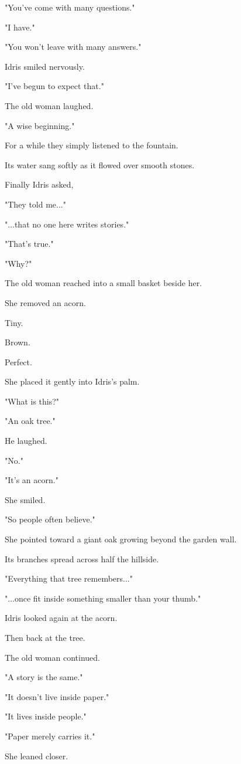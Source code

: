 \documentclass[12pt,openany]{book}
\begin{document}
"You've come with many questions."

"I have."

"You won't leave with many answers."

Idris smiled nervously.

"I've begun to expect that."

The old woman laughed.

"A wise beginning."

For a while they simply listened to the fountain.

Its water sang softly as it flowed over smooth stones.

Finally Idris asked,

"They told me..."

"...that no one here writes stories."

"That's true."

"Why?"

The old woman reached into a small basket beside her.

She removed an acorn.

Tiny.

Brown.

Perfect.

She placed it gently into Idris's palm.

"What is this?"

"An oak tree."

He laughed.

"No."

"It's an acorn."

She smiled.

"So people often believe."

She pointed toward a giant oak growing beyond the garden wall.

Its branches spread across half the hillside.

"Everything that tree remembers..."

"...once fit inside something smaller than your thumb."

Idris looked again at the acorn.

Then back at the tree.

The old woman continued.

"A story is the same."

"It doesn't live inside paper."

"It lives inside people."

"Paper merely carries it."

She leaned closer.
\end{document}
